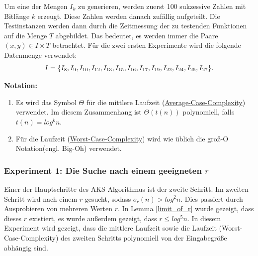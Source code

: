 \documentclass[12pt,oneside]{article}
\theoremstyle{remark}
\theoremstyle{definition}
\begin{document}
Um eine der Mengen $I_{k}$ zu generieren, werden zuerst 100 sukzessive Zahlen mit Bitlänge $k$ erzeugt. Diese Zahlen werden danach zufällig aufgeteilt. Die Testinstanzen werden dann durch die Zeitmessung der zu testenden Funktionen auf die Menge $T$ abgebildet. Das bedeutet, es werden immer die Paare $(x,y) \in I \times T$ betrachtet. Für die zwei ersten Experimente wird die folgende Datenmenge verwendet:
\begin{align*}
I = \{ I_{8},I_{9},I_{10},I_{12},I_{13},I_{15},I_{16},I_{17},I_{19},I_{22},I_{24},I_{25},I_{27} \}.\newline
\end{align*}


\textbf{\small{Notation:}}\newline
\begin{enumerate}
\itemsep0.3em 
\item Es wird das Symbol $\Theta$ für die mittlere Laufzeit (\href{https://en.wikipedia.org/wiki/Average-case_complexity}{Average-Case-Complexity}) verwendet. Im diesem Zusammenhang ist $\Theta(t(n))$ polynomiell, falls $t(n) = log^{k} n$.\newline

\item Für die Laufzeit (\href{https://en.wikipedia.org/wiki/Worst-case_complexity}{Worst-Case-Complexity}) wird wie üblich die groß-O Notation(engl. Big-Oh) verwendet.\newline 
\end{enumerate}


\subsubsection{Experiment 1: Die Suche nach einem geeigneten $r$}
Einer der Hauptschritte des AKS-Algorithmus ist der zweite Schritt. Im zweiten Schritt wird nach einem $r$ gesucht, sodass $o_r(n) > log^2 n$. Dies passiert durch Ausprobieren von mehreren Werten $r$. In Lemma \ref{limit_of_r} wurde gezeigt, dass dieses $r$ existiert, es wurde außerdem gezeigt, dass $r \leq log^5 n$. In diesem Experiment wird gezeigt, dass die mittlere Laufzeit sowie die Laufzeit (Worst-Case-Complexity) des zweiten Schritts polynomiell von der Eingabegröße abhängig sind.\newline
\end{document}
